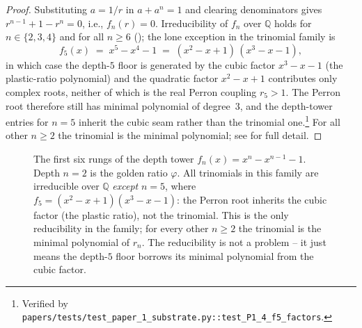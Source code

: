 \documentclass[11pt,a4paper]{article}
\theoremstyle{plain}
\theoremstyle{definition}
\theoremstyle{remark}
\numberwithin{equation}{section}
\providecommand{\Q}{\mathbb{Q}}
\providecommand{\vp}{\varphi}
\begin{document}
\begin{proof}
Substituting $a = 1/r$ in $a + a^n = 1$ and clearing denominators
gives $r^{n-1} + 1 - r^n = 0$, i.e., $f_n(r) = 0$.  Irreducibility
of $f_n$ over $\Q$ holds for $n \in \{2, 3, 4\}$ and for all
$n \ge 6$ (\cite{selmer1956,smyth1971}); the lone exception in the
trinomial family is
\begin{equation}\label{eq:f5-factor}
  f_5(x) \;=\; x^5 - x^4 - 1 \;=\; (x^2 - x + 1)\,(x^3 - x - 1),
\end{equation}
in which case the depth-$5$ floor is generated by the cubic factor
$x^3 - x - 1$ (the plastic-ratio polynomial) and the quadratic
factor $x^2 - x + 1$ contributes only complex roots, neither of
which is the real Perron coupling $r_5 > 1$.  The Perron root
therefore still has minimal polynomial of degree~$3$, and the
depth-tower entries for $n=5$ inherit the cubic seam rather than
the trinomial one.\footnote{Verified by
\texttt{papers/tests/test\_paper\_1\_substrate.py::test\_P1\_4\_f5\_factors}.}
For all other $n \ge 2$ the trinomial is the minimal polynomial;
see \cite[\S2]{two-floor} for full detail.
\end{proof}

\begin{figure}[h]
\centering
{}
\caption{The first six rungs of the depth tower
$f_n(x) = x^n - x^{n-1} - 1$.  Depth $n=2$ is the golden ratio
$\vp$.  All trinomials in this family are irreducible over $\Q$
\emph{except} $n=5$, where
$f_5 = (x^2 - x + 1)(x^3 - x - 1)$: the Perron root inherits the
cubic factor (the plastic ratio), not the trinomial.  This is the
only reducibility in the family; for every other $n \ge 2$ the
trinomial is the minimal polynomial of $r_n$.  The reducibility is
not a problem -- it just means the depth-$5$ floor borrows its
minimal polynomial from the cubic factor.}
\label{fig:phi-ladder}
\end{figure}
\end{document}
